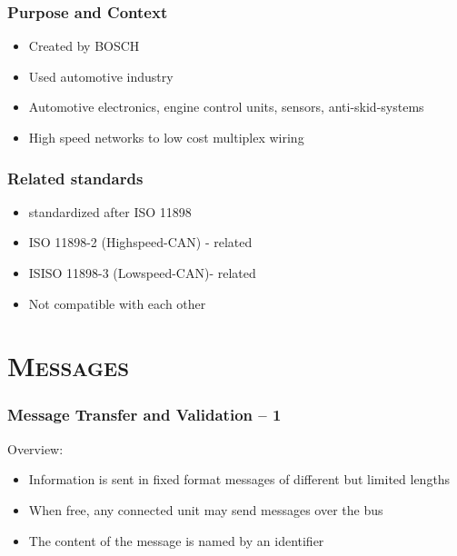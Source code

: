 \documentclass[xcolor=x11names,compress]{beamer}
\renewcommand{\(}{\begin{columns}}
\renewcommand{\)}{\end{columns}}
\newcommand{\<}[1]{\begin{column}{#1}}
\renewcommand{\>}{\end{column}}
\begin{document}
\begin{frame}
  \frametitle{Purpose and Context }
  \begin{itemize}
      \item Created by BOSCH
      \item Used automotive industry 
      \item Automotive electronics, engine control units, sensors, anti-skid-systems
      \item High speed networks to low cost multiplex wiring
  \end{itemize}

\end{frame}

\begin{frame}
  \frametitle{Related standards}
  \begin{itemize}
      \item standardized after ISO 11898
      \item ISO 11898-2 (Highspeed-CAN) - related
      \item ISISO 11898-3 (Lowspeed-CAN)- related      
      \item Not compatible with each other
  \end{itemize}

\end{frame}

%

\section{\scshape Messages}
\begin{frame}
  \frametitle{Message Transfer and Validation -- 1}
  Overview:
  \begin{itemize}
    \item Information is sent in fixed format messages of different but limited lengths
    \item When free, any connected unit may send messages over the bus
    \item The content of the message is named by an identifier
  \end{itemize}

\end{frame}
\end{document}
